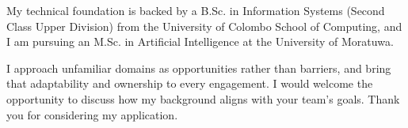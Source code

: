 \documentclass[11pt]{article}
\begin{document}
My technical foundation is backed by a B.Sc. in Information Systems (Second Class Upper Division) from the University of Colombo School of Computing, and I am pursuing an M.Sc. in Artificial Intelligence at the University of Moratuwa.

I approach unfamiliar domains as opportunities rather than barriers, and bring that adaptability and ownership to every engagement. I would welcome the opportunity to discuss how my background aligns with your team's goals. Thank you for considering my application.

\end{document}

